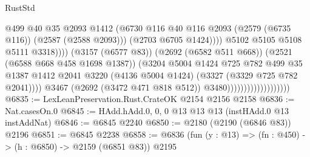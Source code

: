 \begin{lexlean}{RustStd}
\begin{coremodule}
{\begin{coremodule}
{{{{{{{{{{                                                          @499
                                                          @40
                                                          @35
                                                          @2093
                                                          @1412
                                                          (@6730
                                                            @116
                                                            @40
                                                            @116
                                                            @2093
                                                            (@2579 (@6735 @116))
                                                            (@2587 (@2588 @2093)))
                                                          (@2703 @6705 @1424))))
                                                    @5102
                                                    @5105
                                                    @5108
                                                    @5111
                                                    @3318))))
                                            (@3157 (@6577 @83))
                                            (@2692 (@6582 @511 @668))
                                            (@2521 (@6588 @668 @458 @1698 @1387))
                                            (@3204
                                              @5004
                                              @1424
                                              @725
                                              @782
                                              @499
                                              @35
                                              @1387
                                              @1412
                                              @2041
                                              @3220
                                              (@4136 @5004 @1424)
                                              (@3327 (@3329 @725 @782 @2041))))
                                          @3467
                                          (@2692 (@3472 @471 @818 @512))
                                          @3480)))))))))))))))))))
@6835 := LexLeanPreservation.Rust.CrateOK @2154 @2156 @2158
@6836 := Nat.casesOn.{0}
@6845 := HAdd.hAdd.{0, 0, 0} @13 @13 @13 (instHAdd.{0} @13 instAddNat)
@6846 := @6845 @2240
@6850 := @2180 (@2190 (@6846 @83)) @2196
@6851 := @6845 @2238
@6858 := @6836 (fun (y : @13) => (fn : @450) -> (h : @6850) -> @2159 (@6851 @83)) @2195
}}}}}}}}}}
\end{coremodule}}
\end{coremodule}
\end{lexlean}
